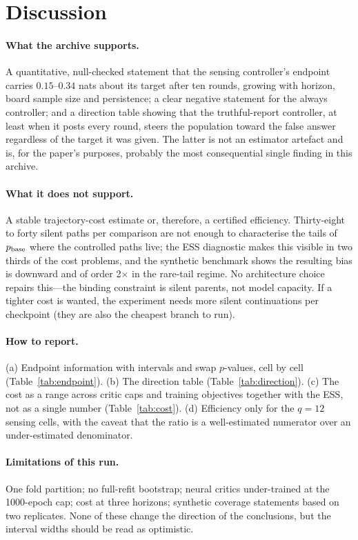 \documentclass[10pt]{article}
\begin{document}
\section{Discussion}
\paragraph{What the archive supports.} A quantitative, null-checked statement that the sensing controller's endpoint carries $0.15$--$0.34$ nats about its target after ten rounds, growing with horizon, board sample size and persistence; a clear negative statement for the always controller; and a direction table showing that the truthful-report controller, at least when it posts every round, steers the population toward the false answer regardless of the target it was given. The latter is not an estimator artefact and is, for the paper's purposes, probably the most consequential single finding in this archive.

\paragraph{What it does not support.} A stable trajectory-cost estimate or, therefore, a certified efficiency. Thirty-eight to forty silent paths per comparison are not enough to characterise the tails of $p_{\rm base}$ where the controlled paths live; the ESS diagnostic makes this visible in two thirds of the cost problems, and the synthetic benchmark shows the resulting bias is downward and of order 2$\times$ in the rare-tail regime. No architecture choice repairs this---the binding constraint is silent parents, not model capacity. If a tighter cost is wanted, the experiment needs more silent continuations per checkpoint (they are also the cheapest branch to run).

\paragraph{How to report.} (a) Endpoint information with intervals and swap $p$-values, cell by cell (Table~\ref{tab:endpoint}). (b) The direction table (Table~\ref{tab:direction}). (c) The cost as a range across critic caps and training objectives together with the ESS, not as a single number (Table~\ref{tab:cost}). (d) Efficiency only for the $q=12$ sensing cells, with the caveat that the ratio is a well-estimated numerator over an under-estimated denominator.

\paragraph{Limitations of this run.} One fold partition; no full-refit bootstrap; neural critics under-trained at the 1000-epoch cap; cost at three horizons; synthetic coverage statements based on two replicates. None of these change the direction of the conclusions, but the interval widths should be read as optimistic.
\end{document}
